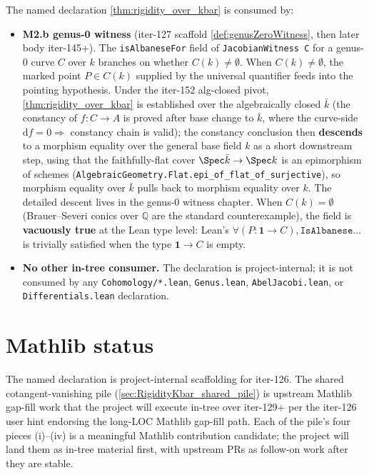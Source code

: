 The named declaration \cref{thm:rigidity_over_kbar} is consumed by:

\begin{itemize}
  \item \textbf{M2.b genus-0 witness} (iter-127 scaffold \cref{def:genusZeroWitness}, then later body iter-145+). The \texttt{isAlbaneseFor} field of \texttt{JacobianWitness C} for a genus-\(0\) curve \(C\) over \(k\) branches on whether \(C(k) \neq \emptyset\). When \(C(k) \neq \emptyset\), the marked point \(P \in C(k)\) supplied by the universal quantifier feeds into the pointing hypothesis. Under the iter-152 alg-closed pivot, \cref{thm:rigidity_over_kbar} is established over the algebraically closed \(\bar k\) (the constancy of \(f \colon C \to A\) is proved after base change to \(\bar k\), where the curve-side \(\mathrm df = 0 \Rightarrow\) constancy chain is valid); the constancy conclusion then \textbf{descends} to a morphism equality over the general base field \(k\) as a short downstream step, using that the faithfully-flat cover \(\Spec \bar k \to \Spec k\) is an epimorphism of schemes (\texttt{AlgebraicGeometry.Flat.epi\_of\_flat\_of\_surjective}), so morphism equality over \(\bar k\) pulls back to morphism equality over \(k\). The detailed descent lives in the genus-\(0\) witness chapter. When \(C(k) = \emptyset\) (Brauer--Severi conics over \(\mathbb Q\) are the standard counterexample), the field is \textbf{vacuously true} at the Lean type level: Lean's \(\forall (P : \mathbf{1} \to C), \mathtt{IsAlbanese}\ldots\) is trivially satisfied when the type \(\mathbf{1} \to C\) is empty.
  \item \textbf{No other in-tree consumer.} The declaration is project-internal; it is not consumed by any \texttt{Cohomology/*.lean}, \texttt{Genus.lean}, \texttt{AbelJacobi.lean}, or \texttt{Differentials.lean} declaration.
\end{itemize}

\section{Mathlib status}

The named declaration is project-internal scaffolding for iter-126. The shared cotangent-vanishing pile (\cref{sec:RigidityKbar_shared_pile}) is upstream Mathlib gap-fill work that the project will execute in-tree over iter-129+ per the iter-126 user hint endorsing the long-LOC Mathlib gap-fill path. Each of the pile's four pieces (i)--(iv) is a meaningful Mathlib contribution candidate; the project will land them as in-tree material first, with upstream PRs as follow-on work after they are stable.
